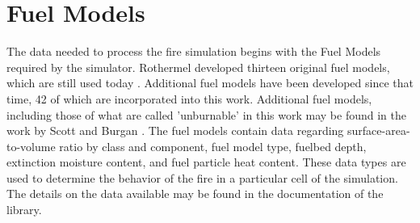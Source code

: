 \section{Fuel Models}
The data needed to process the fire simulation begins with the Fuel Models required by the simulator. Rothermel developed thirteen original fuel models, which are still used today \cite{1983roth}. Additional fuel models have been developed since that time, 42 of which are incorporated into this work. Additional fuel models, including those of what are called 'unburnable' in this work may be found in the work by Scott and Burgan \cite{fuelmodels}.  The fuel models contain data regarding surface-area-to-volume ratio by class and component, fuel model type, fuelbed depth, extinction moisture content, and fuel particle heat content. These data types are used to determine the behavior of the fire in a particular cell of the simulation. The details on the data available may be found in the documentation of the library. 